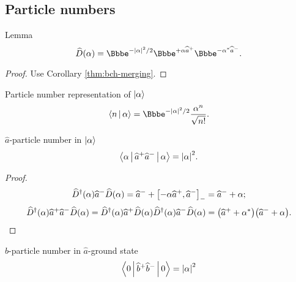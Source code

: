 \subsection{Particle numbers}

\begin{namedthm}{Lemma}
\begin{equation}
\rfun{\widehat{D}}{\alpha} = \ee^{-\vbr{\alpha}^2/2}
\ee^{+\alpha\widehat{a}^+} \ee^{-\alpha^*\widehat{a}^-}.
\end{equation}
\end{namedthm}
\begin{proof}
Use Corollary \ref{thm:bch-merging}.
\end{proof}

\begin{namedthm}{Particle number representation of $\Ket{\alpha}$}
\begin{equation}
\Braket{n | \alpha} = \ee^{-\vbr{\alpha}^2/2}
\frac{\alpha^n}{\sqrt{n!}}.
\end{equation}
\end{namedthm}


\begin{namedthm}{$\widehat{a}$-particle number in $\Ket{\alpha}$}
\begin{equation}
\Braket{\alpha | \widehat{a}^+ \widehat{a}^- | \alpha} = {\left|\alpha\right|}^2.
\end{equation}
\end{namedthm}
\begin{proof}
\begin{equation}
{\widehat{D}^\dagger}\mathopen{}\left(\alpha\right)\mathclose{}\widehat{a}^-{\widehat{D}}\mathopen{}\left(\alpha\right)\mathclose{}
= \widehat{a}^- + {\left[-\alpha \widehat{a}^+, \widehat{a}^-\right]}_-
= \widehat{a}^- + \alpha;
\end{equation}
\begin{equation}
{\widehat{D}^\dagger}\mathopen{}\left(\alpha\right)\mathclose{}\widehat{a}^+
\widehat{a}^-{\widehat{D}}\mathopen{}\left(\alpha\right)\mathclose{}
=
{\widehat{D}^\dagger}\mathopen{}\left(\alpha\right)\mathclose{}\widehat{a}^+{\widehat{D}}\mathopen{}\left(\alpha\right)\mathclose{}
{\widehat{D}^\dagger}\mathopen{}\left(\alpha\right)\mathclose{}\widehat{a}^-{\widehat{D}}\mathopen{}\left(\alpha\right)\mathclose{}
=
{\left(\widehat{a}^+ + \alpha^*\right)}{\left(\widehat{a}^- + \alpha\right)}.
\end{equation}
\end{proof}

\begin{namedthm}{$\widehat{b}$-particle number in $\widehat{a}$-ground state}
\begin{equation}
\Braket{0 | \widehat{b}^+ \widehat{b}^- | 0} = {\left|\alpha\right|}^2
\end{equation}
\end{namedthm}

